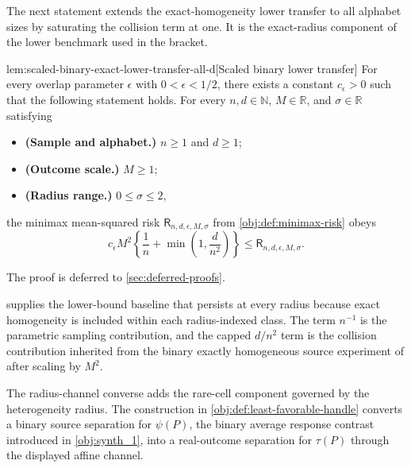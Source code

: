 \documentclass[11pt]{article}
\begin{document}
The next statement extends the exact-homogeneity lower transfer to all alphabet sizes by saturating the collision term at one. It is the exact-radius component of the lower benchmark used in the bracket.

\begin{lemmav}{lem:scaled-binary-exact-lower-transfer-all-d}[Scaled binary lower transfer]
For every overlap parameter \(\epsilon\) with \(0<\epsilon<1/2\), there exists a constant \(c_{\epsilon}>0\) such that the following statement holds.  For every \(n,d\in\mathbb N\), \(M\in\mathbb R\), and \(\sigma\in\mathbb R\) satisfying
\begin{itemize}
\item \textbf{(Sample and alphabet.)} \(n\ge 1\) and \(d\ge 1\);
\item \textbf{(Outcome scale.)} \(M\ge 1\);
\item \textbf{(Radius range.)} \(0\le \sigma\le 2\),
\end{itemize}
the minimax mean-squared risk \(\mathsf R_{n,d,\epsilon,M,\sigma}\) from \cref{obj:def:minimax-risk} obeys
\[
c_{\epsilon}M^2\left\{\frac{1}{n}+\min\left(1,\frac{d}{n^2}\right)\right\}
\le
\mathsf R_{n,d,\epsilon,M,\sigma}.
\]
\end{lemmav}

The proof is deferred to \cref{sec:deferred-proofs}.

 supplies the lower-bound baseline that persists at every radius because exact homogeneity is included within each radius-indexed class. The term \(n^{-1}\) is the parametric sampling contribution, and the capped \(d/n^2\) term is the collision contribution inherited from the binary exactly homogeneous source experiment of \citet{ZengBalakrishnanHanKennedy2024} after scaling by \(M^2\).

The radius-channel converse adds the rare-cell component governed by the heterogeneity radius. The construction in \cref{obj:def:least-favorable-handle} converts a binary source separation for \(\psi(P)\), the binary average response contrast introduced in \cref{obj:synth_1}, into a real-outcome separation for \(\tau(P)\) through the displayed affine channel.
\end{document}
